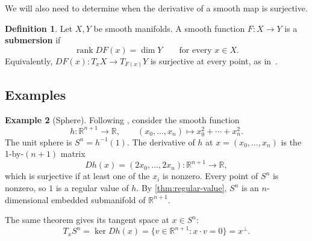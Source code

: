 \documentclass[12pt]{article}
\theoremstyle{definition}
\newtheorem{definition}{Definition}[section]
\newtheorem{example}[definition]{Example}
\theoremstyle{plain}
\theoremstyle{remark}
\newcommand{\R}{\mathbb{R}}
\DeclareMathOperator{\rank}{rank}
\begin{document}
We will also need to determine when the derivative of a smooth map is surjective.


\begin{definition}\label{def:submersion}
  Let \( X, Y \) be smooth manifolds.
  A smooth function \( F : X \longrightarrow Y \) is a \textbf{submersion} if
  \[
    \rank DF(x) = \dim Y \qquad \text{for every } x \in X.
  \]
  Equivalently, \( DF(x) : T_x X \longrightarrow T_{F(x)}Y \) is surjective at every point, as in~\cite[Definition 4.16 and Section 5.1]{segal}.
\end{definition}

\subsection{Examples}
\begin{example}[Sphere]\label{ex:sphere}\label{ex:sphere-tangent-space}
  Following \cite[Examples 3.19 and 5.14]{segal}, consider the smooth function
  \[
    h : \R^{n+1} \longrightarrow \R, \qquad (x_0, \dots, x_n) \mapsto x_0^2 + \cdots + x_n^2.
  \]
  The unit sphere is \( S^n = h^{-1}(1) \). The derivative of \( h \) at \( x = (x_0, \dots, x_n) \) is the 1-by-\( (n+1) \) matrix
  \[
    Dh(x) = (2x_0, \dots, 2x_n) : \R^{n+1} \longrightarrow \R,
  \]
  which is surjective if at least one of the \( x_i \) is nonzero. Every point of \( S^n \) is nonzero, so \( 1 \) is a regular value of \( h \). By \cref{thm:regular-value}, \( S^n \) is an \( n \)-dimensional embedded submanifold of \( \R^{n+1} \).

  The same theorem gives its tangent space at \( x \in S^n \):
  \[
    T_xS^n = \ker Dh(x) = \{v \in \R^{n+1} : x \cdot v = 0\} = x^\perp.
  \]
\end{example}
\end{document}
